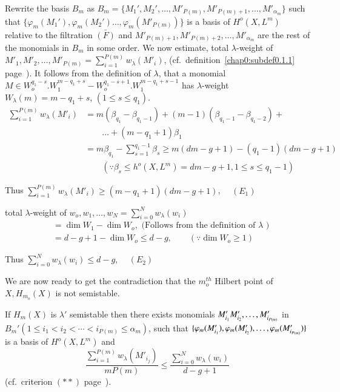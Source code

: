 \noindent
Rewrite the basis $B_m$ as $B_m = \{M_1', M_2', \ldots , M'_{P(m)},
M'_{P(m)+1}, \ldots , M'_{\alpha_m}\}$ such that $\{\varphi_m (M_1'),
\varphi_m(M_2') \ldots , \varphi_m (M'_{P(m)})\}$ is a basis of
$H^o(X,L^m)$ relative to the filtration $\bar{(F)}$ and
$M'_{P(m)+1}, M'_{P(m)+2}, \ldots , M'_{\alpha_m}$ are the rest of the
monomials in $B_m$ in some order. We now estimate, total\pageoriginale
$\lambda$-weight of $M'_1, M'_2 , \ldots , M'_{P(m)} =
\sum\limits_{i=1}^{P(m)} w_\lambda (M'_i)$, (cf.\ 
definition~\ref{chap0:subdef0.1.1} page~\pageref{chap0:subdef0.1.1}). 
It follows from the definition of $\lambda$, that a monomial 
$M \in W_o^{q_1-s}. W_1^{m-q_1+s} -
W_o^{q_1-s+1}. W_1^{m-q_1+s-1}$ has $\lambda$-weight $W_\lambda
(m) = m-q_1+s$, $(1 \le s \le q_1)$. 
\begin{align*}
\sum^{P(m)}_{i=1} w_\lambda (M'_i) & = m( \beta_{q_1} - \beta_{q_1-1})
+ (m-1) (\beta_{q_1-1} - \beta_{q_1-2}) +\\ 
&\qquad\ldots + (m-q_1+1)\beta_1\\ 
& = m \beta_{q_1} - \sum_{s=1}^{q_1-1} \beta_s \ge m(dm-g+1)- (q_1-1)
(dm-g+1)\\
& \qquad (\because \beta_s \le h^o (X,L^m) = dm-g+1, 1 \le s \le q_1-1)
\end{align*}

\noindent
Thus $\sum\limits_{i=1}^{P(m)} w_ \lambda(M'_i) \ge (m-q_1+1)
(dm-g+1)$, $\quad (E_1)$ 

\noindent
total $ \lambda$-weight of  $w_o, w_1, \ldots ,w_N =
\sum\limits^{N}_{i=0} w_\lambda (w_i)$ 
\begin{align*}
& = \dim W_1 - \dim W_o, \text{ (Follows from the definition of
    $\lambda$ )}\\
& = d-g+1 - \dim W_o \le d-g,  \qquad (\because \dim W_o  \ge 1)
\end{align*}

Thus $ \sum\limits_{i=0}^{N} w_ \lambda (w_i) \le d-g$,  $\quad (E_2)$

We are now ready to get the contradiction  that the $m_o^{th}$ Hilbert
point of $X, H_{m_o}(X)$ is not semistable. 

If $H_m(X)$ is $\lambda '$ semistable then there exists monomials 
$M'_{i_1} M'_{i_2}, \ldots,\break M'_{i_{P(m)}}$ in $B_m'(1 \le i_1 < i_2 <
\cdots < i_{P(m)} \le \alpha_m)$, such that $\{\varphi_m (M'_{i_1}),
\varphi_m\break (M'_{i_2}) , \ldots ,  \varphi_m (M'_{i_{P(m)}})\}$ is a
basis of $H^o (X,L^m)$ and 
$$\dfrac{\sum\limits_{i=1}^{P(m)} w_\lambda
  (M'_{i_j})}{mP(m)} \le \dfrac{\sum\limits_{i=0}^{N} w_\lambda
  (w_i)}{d-g+1}$$ 
(cf.\ criterion $(**)$ page~\pageref{page10}). 

